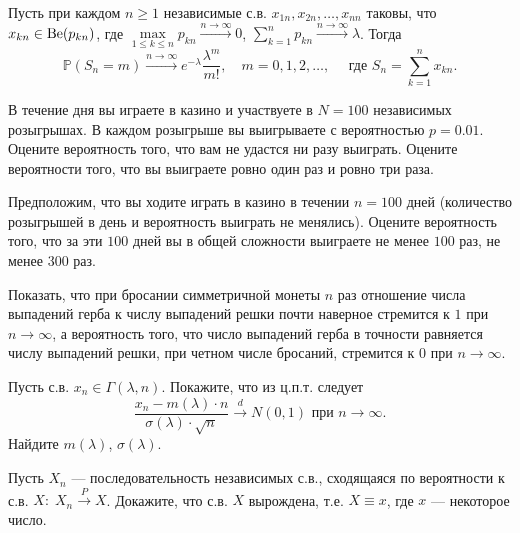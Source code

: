 \begin{problem}
Пусть при каждом $n\geqslant 1$ независимые с.в. $x_{1n}, x_{2n},\ldots, x_{nn}$ таковы, что $x_{kn}\in \mathrm{Be}(p_{kn})$, где 
$\max\limits_{1\leqslant k\leqslant n} p_{kn}\xrightarrow{n\to\infty}0$, $\sum\limits_{k=1}^{n}p_{kn}\xrightarrow{n\to\infty}\lambda$. 
Тогда 
\begin{equation}
\label{TPois}
{\mathbb P}(S_n=m)\xrightarrow{n\to\infty} e^{-\lambda}\frac{\lambda^m}{m!}, \quad m=0,1,2,\ldots, \quad 
\text{ где } S_n=\sum\limits_{k=1}^{n} x_{kn} . 
\end{equation}
\end{problem}

\begin{problem}
В течение дня вы играете в казино и участвуете в $N=100$ независимых розыгрышах. В каждом розыгрыше вы выигрываете с вероятностью 
$p=0.01$. Оцените вероятность того, что вам не удастся ни разу выиграть. Оцените вероятности того, что вы выиграете ровно 
один раз и ровно три раза.

Предположим, что вы ходите играть в казино в течении $n=100$ дней (количество розыгрышей в день и вероятность выиграть не менялись). 
Оцените вероятность того, что за эти $100$ дней вы в общей сложности выиграете не менее $100$ раз, не менее $300$ раз. 

\end{problem}



\begin{problem}
Показать, что при бросании симметричной монеты $n$ раз отношение числа выпадений герба к числу выпадений решки почти наверное стремится 
к $1$ при $n\to\infty$, а вероятность того, что число выпадений герба в точности равняется числу выпадений решки, при четном числе 
бросаний, стремится к $0$ при $n\to\infty$. 
\end{problem}



\begin{problem}
Пусть с.в. $x_n\in \Gamma(\lambda,n)$. Покажите, что из ц.п.т. следует 
$$
\frac{x_n-m(\lambda)\cdot n}{\sigma(\lambda)\cdot\sqrt{n}} \xrightarrow{d} N(0,1) \text{ при } n\to\infty . 
$$
Найдите $m(\lambda)$, $\sigma(\lambda)$. 
\end{problem}



\begin{problem}
Пусть $X_n$ --- последовательность независимых с.в., сходящаяся по вероятности к с.в. $X:\; X_n\xrightarrow{P}X$. Докажите, 
что с.в. $X$ вырождена, т.е. $X\equiv x$, где $x$ --- некоторое число. 
\end{problem}

